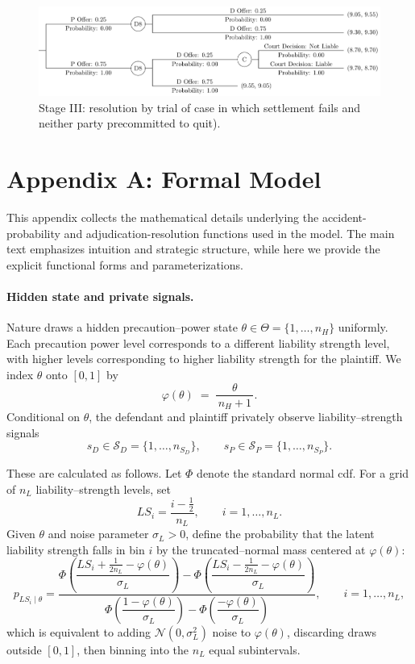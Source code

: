\documentclass{article}
\begin{document}
  \begin{figure}[t]
    \centering
    \includegraphics[width=\textwidth]{../Figures/smalltree_end_adjudication.pdf}
    \caption{Stage III: resolution by trial of case in which settlement fails and neither party precommitted to quit).}
    \label{fig:smalltree_end_adjudication.pdf}
  \end{figure}

\section*{Appendix A: Formal Model}

This appendix collects the mathematical details underlying the accident-probability and adjudication-resolution functions used in the model. The main text emphasizes intuition and strategic structure, while here we provide the explicit functional forms and parameterizations. 

\paragraph{Hidden state and private signals.}
Nature draws a hidden precaution–power state $\theta\in\Theta=\{1,\dots,n_H\}$ uniformly. Each precaution power level corresponds to a different liability strength level, with higher levels corresponding to higher liability strength for the plaintiff. We index $\theta$ onto $[0,1]$ by
\[
\varphi(\theta)\;=\;\frac{\theta}{\,n_H+1\,}.
\]
Conditional on $\theta$, the defendant and plaintiff privately observe liability–strength signals
\[
s_D\in\mathcal{S}_D=\{1,\dots,n_{S_D}\},\qquad
s_P\in\mathcal{S}_P=\{1,\dots,n_{S_P}\}.
\]

These are calculated as follows. Let $\Phi$ denote the standard normal cdf. For a grid of $n_L$ liability–strength levels, set
\[
LS_i=\frac{i-\tfrac12}{n_L},\qquad i=1,\dots,n_L.
\]
Given $\theta$ and noise parameter $\sigma_L>0$, define the probability that the latent liability strength falls in bin $i$ by the truncated–normal mass centered at $\varphi(\theta)$:
\[
p_{LS_i\mid \theta}
=
\frac{
\Phi\!\left(\dfrac{LS_i+\tfrac{1}{2n_L}-\varphi(\theta)}{\sigma_L}\right)
-
\Phi\!\left(\dfrac{LS_i-\tfrac{1}{2n_L}-\varphi(\theta)}{\sigma_L}\right)
}{
\Phi\!\left(\dfrac{1-\varphi(\theta)}{\sigma_L}\right)
-
\Phi\!\left(\dfrac{-\varphi(\theta)}{\sigma_L}\right)
},
\qquad i=1,\dots,n_L,
\]
which is equivalent to adding $\mathcal{N}(0,\sigma_L^2)$ noise to $\varphi(\theta)$, discarding draws outside $[0,1]$, then binning into the $n_L$ equal subintervals.
\end{document}
